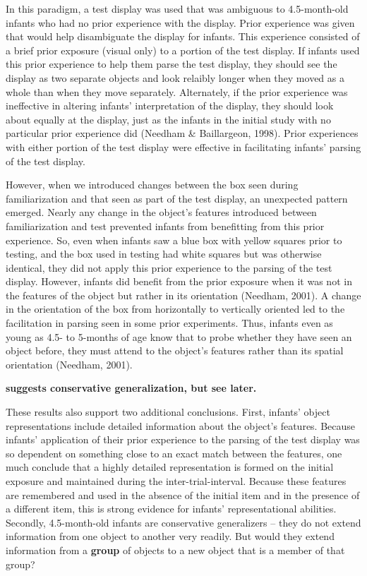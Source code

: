 In this paradigm, a test display was used that was ambiguous to
4.5-month-old infants who had no prior experience with the display.
Prior experience was given that would help disambiguate the display
for infants.  This experience consisted of a brief prior exposure
(visual only) to a portion of the test display.  If infants used this
prior experience to help them parse the test display, they should see
the display as two separate objects and look relaibly longer when they
moved as a whole than when they move separately.  Alternately, if the
prior experience was ineffective in altering infants'
interpretation of the display, they should look about equally at the
display, just as the infants in the initial study with no particular
prior experience did (Needham \& Baillargeon, 1998).  Prior experiences
with either portion of the test display were effective in facilitating
infants' parsing of the test display.  

However, when we introduced changes between the box seen during
familiarization and that seen as part of the test display, an
unexpected pattern emerged.  Nearly any change in the object's
features introduced between familiarization and test prevented infants
from benefitting from this prior experience.  So, even when infants
saw a blue box with yellow squares prior to testing, and the box used
in testing had white squares but was otherwise identical, they did not
apply this prior experience to the parsing of the test display.
However, infants did benefit from the prior exposure when it was not
in the features of the object but rather in its orientation (Needham,
2001).  A change in the orientation of the box from horizontally to
vertically oriented led to the facilitation in parsing seen in some
prior experiments.  Thus, infants even as young as 4.5- to 5-months of
age know that to probe whether they have seen an object before, they
must attend to the object's features rather than its spatial
orientation (Needham, 2001).

{
\bf suggests conservative generalization, but see later.
}

These results also support two additional conclusions.  First,
infants' object representations include detailed information
about the object's features.  Because infants'
application of their prior experience to the parsing of the test
display was so dependent on something close to an exact match between
the features, one much conclude that a highly detailed representation
is formed on the initial exposure and maintained during the
inter-trial-interval.  Because these features are remembered and used
in the absence of the initial item and in the presence of a different
item, this is strong evidence for infants' representational
abilities.  Secondly, 4.5-month-old infants are conservative
generalizers -- they do not extend information from one object to
another very readily.  But would they extend information from a {\bf group}
of objects to a new object that is a member of that group?


